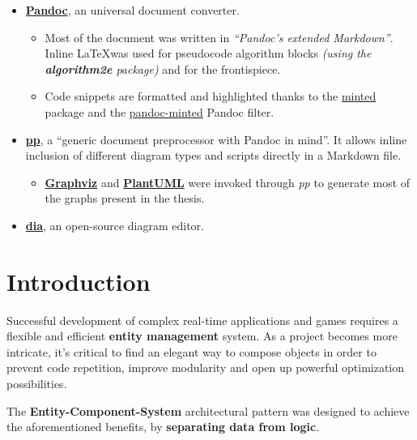 \documentclass[oneside, 12pt, a4paper, openany]{book}
\providecommand{\tightlist}{%
  \setlength{\itemsep}{0pt}\setlength{\parskip}{0pt}}
\begin{document}
\begin{itemize}
\item
  \href{http://pandoc.org/}{\textbf{Pandoc}}, an universal document
  converter.

  \begin{itemize}
  \item
    Most of the document was written in \emph{``Pandoc's extended
    Markdown''}. Inline \LaTeX was used for pseudocode algorithm blocks
    \emph{(using the \textbf{algorithm2e} package)} and for the
    frontispiece.
  \item
    Code snippets are formatted and highlighted thanks to the
    \href{https://github.com/gpoore/minted}{minted} package and the
    \href{https://github.com/nick-ulle/pandoc-minted}{pandoc-minted}
    Pandoc filter.
  \end{itemize}
\item
  \href{https://github.com/CDSoft/pp}{\textbf{pp}}, a ``generic document
  preprocessor with Pandoc in mind''. It allows inline inclusion of
  different diagram types and scripts directly in a Markdown file.

  \begin{itemize}
  \tightlist
  \item
    \href{http://www.graphviz.org}{\textbf{Graphviz}} and
    \href{http://plantuml.com/}{\textbf{PlantUML}} were invoked through
    \emph{pp} to generate most of the graphs present in the thesis.
  \end{itemize}
\item
  \href{http://dia-installer.de/}{\textbf{dia}}, an open-source diagram
  editor.
\end{itemize}

\newpage

\hypersetup{linkcolor=black} \tableofcontents

\hypersetup{linkcolor=blue}

\chapter{Introduction}\label{introduction}

Successful development of complex real-time applications and games
requires a flexible and efficient \textbf{entity management} system. As
a project becomes more intricate, it's critical to find an elegant way
to compose objects in order to prevent code repetition, improve
modularity and open up powerful optimization possibilities.

The \textbf{Entity-Component-System} architectural pattern was designed
to achieve the aforementioned benefits, by \textbf{separating data from
logic}.
\end{document}
